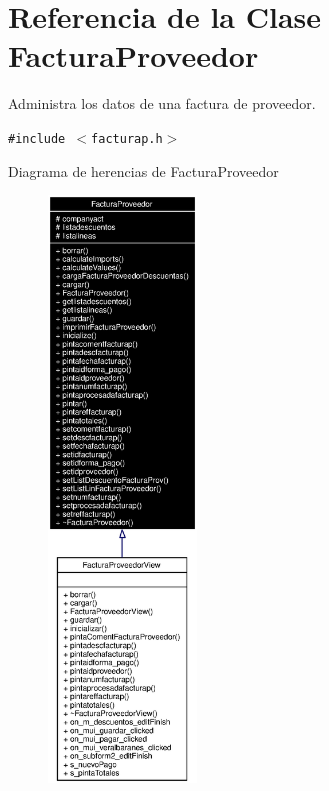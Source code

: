 \section{Referencia de la Clase Factura\-Proveedor}
\label{classFacturaProveedor}
Administra los datos de una factura de proveedor.  


{\tt \#include $<$facturap.h$>$}

Diagrama de herencias de Factura\-Proveedor\begin{figure}[H]
\begin{center}
\leavevmode
\includegraphics[width=112pt]{classFacturaProveedor__inherit__graph}
\end{center}
\end{figure}
